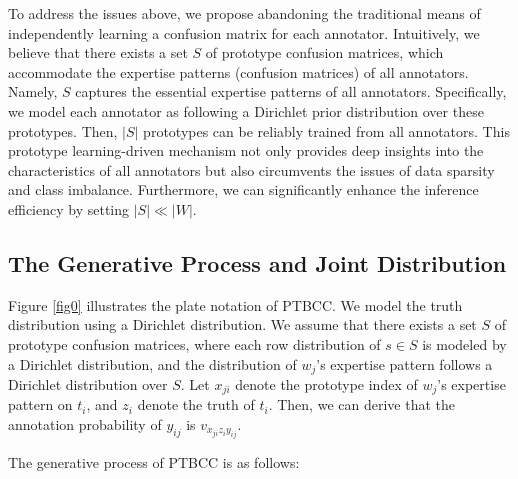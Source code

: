\documentclass[letterpaper]{article} %
\begin{document}
To address the issues above, we propose abandoning the traditional means of independently learning a confusion matrix for each annotator. Intuitively, we believe that there exists a set $S$ of prototype confusion matrices, which accommodate the expertise patterns (confusion matrices) of all annotators. Namely, $S$ captures the essential expertise patterns of all annotators. Specifically, we model each annotator as following a Dirichlet prior distribution over these prototypes. Then, $|S|$ prototypes can be reliably trained from all annotators. This prototype learning-driven mechanism not only provides deep insights into the characteristics of all annotators but also circumvents the issues of data sparsity and class imbalance. Furthermore, we can significantly enhance the inference efficiency by setting $|S|\ll|W|$.
\subsection{The Generative Process and Joint Distribution}
Figure \ref{fig0} illustrates the plate notation of PTBCC. We model the truth distribution using a Dirichlet distribution. We assume that there exists a set $S$ of prototype confusion matrices, where each row distribution of $s\in S$ is modeled by a Dirichlet distribution, and the distribution of $w_{j}$'s expertise pattern follows a Dirichlet distribution over $S$. Let $x_{ji}$ denote the prototype index of $w_{j}$'s expertise pattern on $t_{i}$, and $z_{i}$ denote the truth of $t_{i}$. Then, we can derive that the annotation probability of $y_{ij}$ is $v_{x_{ji}z_{i}y_{ij}}$.

The generative process of PTBCC is as follows:
\end{document}
